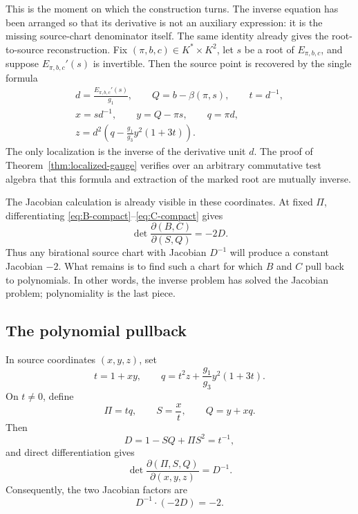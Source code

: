 This is the moment on which the construction turns.  The inverse equation
has been arranged so that its derivative is not an auxiliary expression:
it is the missing source-chart denominator itself.  The same identity
already gives the root-to-source reconstruction.  Fix
\((\pi,b,c)\in K^*\times K^2\), let \(s\) be a root of
\(E_{\pi,b,c}\), and suppose \(E_{\pi,b,c}'(s)\) is invertible.  Then the
source point is recovered by the single formula
\begin{equation}
\boxed{
\begin{gathered}
 d=\frac{E_{\pi,b,c}'(s)}{g_1},\qquad
 Q=b-\beta(\pi,s),\qquad t=d^{-1},\\
 x=sd^{-1},\qquad y=Q-\pi s,\qquad q=\pi d,\\
 z=d^2\left(q-\frac{g_1}{g_3}y^2(1+3t)\right).
\end{gathered}}
\label{eq:boxed-root-reconstruction}
\end{equation}
The only localization is the inverse of the derivative unit \(d\).  The
proof of Theorem~\ref{thm:localized-gauge} verifies over an arbitrary
commutative test algebra that this formula and extraction of the marked root
are mutually inverse.

The Jacobian calculation is already visible in these coordinates.  At fixed
\(\Pi\), differentiating \eqref{eq:B-compact}--\eqref{eq:C-compact} gives
\begin{equation}
 \det\frac{\partial(B,C)}{\partial(S,Q)}=-2D.
 \label{eq:plane-jacobian}
\end{equation}
Thus any birational source chart with Jacobian \(D^{-1}\) will produce a
constant Jacobian \(-2\).  What remains is to find such a chart for which
\(B\) and \(C\) pull back to polynomials.  In other words, the inverse
problem has solved the Jacobian problem; polynomiality is the last piece.

\subsection{The polynomial pullback}

In source coordinates \((x,y,z)\), set
\begin{equation}
 t=1+xy,
 \qquad
 q=t^2z+\frac{g_1}{g_3}y^2(1+3t).
 \label{eq:tq}
\end{equation}
On \(t\neq0\), define
\begin{equation}
 \Pi=tq,\qquad S=\frac{x}{t},\qquad Q=y+xq.
 \label{eq:source-chart}
\end{equation}
Then
\[
 D=1-SQ+\Pi S^2=t^{-1},
\]
and direct differentiation gives
\begin{equation}
 \det\frac{\partial(\Pi,S,Q)}{\partial(x,y,z)}=D^{-1}.
 \label{eq:source-chart-jacobian}
\end{equation}
Consequently, the two Jacobian factors are
\[
 D^{-1}\cdot(-2D)=-2.
\]


